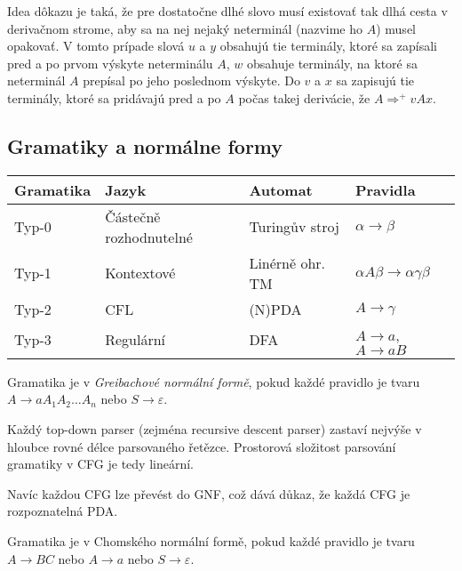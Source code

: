 Idea dôkazu je taká, že pre dostatočne dlhé slovo musí existovať
tak dlhá cesta v derivačnom strome, aby sa na nej nejaký 
neterminál (nazvime ho $A$) musel opakovať. V tomto prípade 
slová $u$ a $y$ obsahujú tie terminály, ktoré sa zapísali pred a po 
prvom výskyte neterminálu $A$, $w$ obsahuje terminály, na ktoré
sa neterminál $A$ prepísal po jeho poslednom výskyte.
Do $v$ a $x$ sa zapisujú tie terminály, ktoré sa pridávajú
pred a po $A$ počas takej derivácie, že $A \Rightarrow^+ vAx$.

\subsection{Gramatiky a normálne formy}


\begin{longtable}[]{llll}
\toprule
Gramatika & Jazyk & Automat & Pravidla \tabularnewline
\midrule
\endhead
Typ-0 & Částečně rozhodnutelné & Turingův stroj & $\alpha \rightarrow \beta$ \tabularnewline
Typ-1 & Kontextové & Linérně ohr. TM & $\alpha A \beta \rightarrow \alpha \gamma \beta$ \tabularnewline
Typ-2 & CFL & (N)PDA &	$ A\rightarrow \gamma$ \tabularnewline
Typ-3 & Regulární & DFA & $A \rightarrow a$, $A \rightarrow aB$ \tabularnewline
\bottomrule
\end{longtable}


\bigskip

\begin{definition}
    Gramatika je v {\em Greibachové normální formě}, pokud
    každé pravidlo je tvaru
    $A \to a A_1 A_2 \ldots A_n$ nebo $S \to \varepsilon$.
\end{definition}

Každý top-down parser (zejména recursive descent parser)
zastaví nejvýše v hloubce rovné délce parsovaného řetězce. Prostorová
složitost parsování gramatiky v CFG je tedy lineární.

Navíc každou CFG lze převést do GNF, což dává důkaz, že každá CFG je
rozpoznatelná PDA.

\begin{definition}
    Gramatika je v Chomského normální formě, pokud každé pravidlo je
    tvaru $A \to BC$ nebo $A \to a$ nebo $S \to \varepsilon$.
\end{definition}

